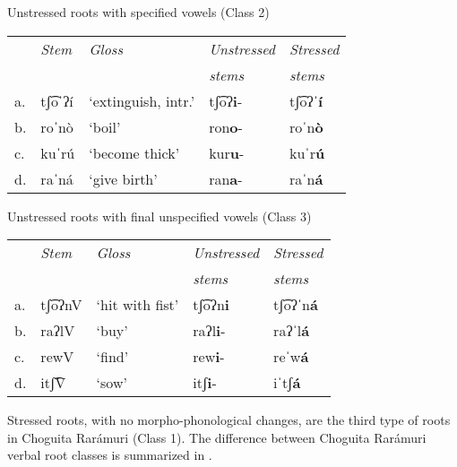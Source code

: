 \ea\label{ex: Unstressed roots with specified vowels (Class 2)}
{Unstressed roots with specified vowels (Class 2)}

\begin{tabular}{lllll}
     & \textit{Stem} & \textit{Gloss} & \textit{Unstressed} & \textit{Stressed}\\
     & & & \textit{stems} & \textit{stems}\\
     a. & {tʃ͡oˈʔí} &‘extinguish, intr.'& {tʃ͡oʔ\textbf{i}-}&{tʃ͡oʔˈ\textbf{í}}\\
     b. & {roˈnò} & {‘boil'} & {ron\textbf{o}-} & {roˈn\textbf{ò}} \\
     c. & {kuˈrú} &`become thick'&{kur\textbf{u}-}&{kuˈr\textbf{ú}}\\
     d. & {raˈná} &{‘give birth’} & {ran\textbf{a}-} & {raˈn\textbf{á}}\\
\end{tabular}
    \z

\ea\label{ex: Unstressed roots with final unspecified vowels (Class 3)}
{Unstressed roots with final unspecified vowels (Class 3)}

\begin{tabular}{lllll}
     & \textit{Stem} & \textit{Gloss} & \textit{Unstressed} & \textit{Stressed}\\
     & & & \textit{stems} & \textit{stems}\\
     a. & {tʃ͡oʔnV} & {‘hit with fist'} & {tʃ͡oʔn\textbf{i}} & {tʃ͡oʔˈn\textbf{á}}\\
     b. & {raʔlV} & {`buy'} & {raʔl\textbf{i}-} & {raʔˈl\textbf{á}} \\
     c. & {rewV} & {‘find’} & {rew\textbf{i}-} & {reˈw\textbf{á}}\\
     d. & {itʃ͡V} & {`sow'} & {itʃ\textbf{i}-} & {iˈtʃ\textbf{á}}\\
\end{tabular}

      \z

Stressed roots, with no morpho-phonological changes, are the third type of roots in Choguita Rarámuri (Class 1). The difference between Choguita Rarámuri verbal root classes is summarized in .

